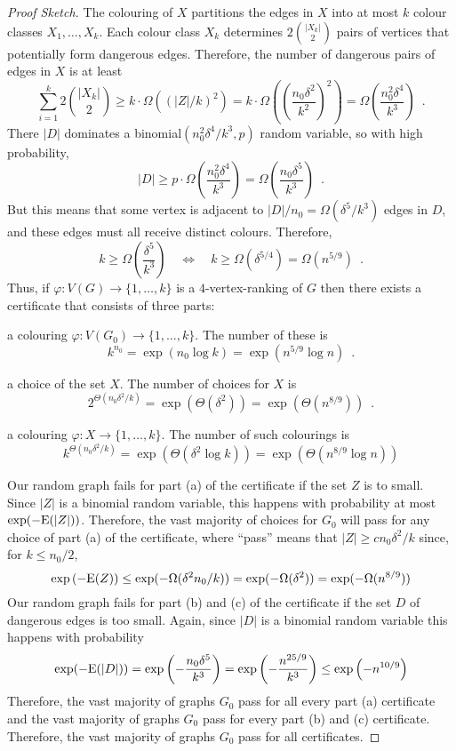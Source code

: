 \documentclass{patmorin}
\begin{document}
\begin{proof}[Proof Sketch]
  The colouring of $X$ partitions the edges in $X$ into at most $k$ colour classes $X_1,\ldots,X_k$.  Each colour class $X_k$ determines $2\binom{|X_k|}{2}$ pairs of vertices that potentially form dangerous edges. Therefore, the number of dangerous pairs of edges in $X$ is at least
  \[
    \sum_{i=1}^k 2\binom{|X_k|}{2} \ge k\cdot\Omega((|Z|/k)^2) =   k\cdot\Omega\left(\left(\frac{n_0\delta^2}{k^2}\right)^2\right)
    = \Omega\left(\frac{n_0^2\delta^4}{k^3}\right) \enspace .
  \]
  There $|D|$ dominates a binomial$(n_0^2\delta^4/k^3,p)$ random variable, so with high probability,
  \[
     |D| \ge p\cdot \Omega\left(\frac{n_0^2\delta^4}{k^3}\right)
     = \Omega\left(\frac{n_0\delta^5}{k^3}\right) \enspace .
  \]
  But this means that some vertex is adjacent to $|D|/n_0=\Omega(\delta^5/k^3)$ edges in $D$, and these edges must all receive distinct colours.  Therefore,
  \[
    k\ge \Omega\left(\frac{\delta^5}{k^3}\right)
    \quad\Leftrightarrow\quad
    k \ge \Omega(\delta^{5/4})=\Omega(n^{5/9}) \enspace .
  \]
  Thus, if $\varphi:V(G)\to\{1,\ldots,k\}$ is a $4$-vertex-ranking of $G$ then there exists a certificate that consists of three parts:
  \begin{compactenum}[(a)]
    \item a colouring $\varphi:V(G_0)\to\{1,\ldots,k\}$. The number of these is
    \[ k^{n_0} = \exp(n_0\log k) = \exp(n^{5/9}\log n) \enspace . \]
    \item a choice of the set $X$. The number of choices for $X$ is
    \[  2^{\Theta(n_0\delta^2/k)}=\exp(\Theta(\delta^2))=\exp(\Theta(n^{8/9})) \enspace . \]
    \item a colouring $\varphi:X\to\{1,\ldots,k\}$. The number of such colourings is
    \[  k^{\Theta(n_0\delta^2/k)}=\exp(\Theta(\delta^2\log k))=\exp(\Theta(n^{8/9}\log n)) \]
  \end{compactenum}
  Our random graph fails for part (a) of the certificate if the set $Z$ is to small.  Since $|Z|$ is a binomial random variable, this happens with probability at most $\exp(-\mathrm{E}(|Z|))$.  Therefore, the vast majority of choices for $G_0$ will pass for any choice of part (a) of the certificate, where ``pass'' means that $|Z|\ge cn_0\delta^2/k$ since, for $k \le n_0/2$,
  \[
     \exp\left(-\mathrm{E}(Z)\right)\le \exp(-\Omega(\delta^2 n_0/k)) =  \exp(-\Omega(\delta^2)) = \exp(-\Omega(n^{8/9}))
  \]
  Our random graph fails for part (b) and (c) of the certificate if the set $D$ of dangerous edges is too small.  Again, since $|D|$ is a binomial random variable this happens with probability
  \[
      \exp(-\mathrm{E}(|D|))=\exp\left(-\frac{n_0\delta^5}{k^3}\right)
      = \exp\left(-\frac{n^{25/9}}{k^3}\right) \le \exp\left(-n^{10/9}\right)
  \]
  Therefore, the vast majority of graphs $G_0$ pass for all every part (a) certificate and the vast majority of graphs $G_0$ pass for every part (b) and (c) certificate.  Therefore, the vast majority of graphs $G_0$ pass for all certificates.
\end{proof}
\end{document}
